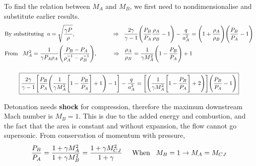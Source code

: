 \documentclass[a4paper,10pt]{article}
\begin{document}
\vspace*{-0.6cm}
To find the relation between $M_A$ and $M_B$, we first need to nondimensionalise and substitute earlier results.
\begin{gather*}
    \begin{split}
        &\text{By substituting}\hspace*{0.2cm}a = \sqrt{\frac{\gamma P}{\rho}},\hspace*{2.3cm}\Rightarrow\hspace*{0.2cm}\frac{2\gamma}{\gamma-1}\Bigg(\frac{P_B}{P_A}\frac{\rho_A}{\rho_B}-1\Bigg)-\frac{q}{a_A^2} = \Bigg(1+\frac{\rho_A}{\rho_B}\Bigg)\Bigg(\frac{P_B}{P_A}-1\Bigg)\\
        &\text{From}\hspace*{0.3cm}M_A^2 = \frac{1}{\gamma P_A\rho_A}\Bigg(\frac{P_B-P_A}{\rho_A^{-1}-\rho_B^{-1}}\Bigg),\hspace*{1cm}\Rightarrow\hspace*{0.2cm}\frac{\rho_A}{\rho_B}=\frac{1}{\gamma M_A^2}\Bigg(1-\frac{P_B}{P_A}\Bigg)+1
    \end{split}\\[0.5cm]
    \boxed{\frac{2\gamma}{\gamma-1}\Bigg[\frac{P_B}{P_A}\Bigg(\frac{1}{\gamma M_A^2}\Bigg[1-\frac{P_B}{P_A}\Bigg]+1\Bigg)-1\Bigg]-\frac{q}{a_A^2}=\Bigg[\Bigg(\frac{1}{\gamma M_A^2}\Bigg[1-\frac{P_B}{P_A}\Bigg]+2\Bigg)\Bigg]\Bigg(\frac{P_B}{P_A}-1\Bigg)}
\end{gather*}

Detonation needs \textbf{shock} for compression, therefore the maximum downstream Mach number is $M_B=1$. This is due to the added energy and combustion, and the fact that the area is constant and without expansion, the flow cannot go supersonic. From conservation of momentum with pressure,
\begin{gather*}
    \frac{P_B}{P_A} = \frac{1+\gamma M_A^2}{1+\gamma M_B^2} = \frac{1+\gamma M_{CJ}^2}{1+\gamma}\hspace*{0.5cm}\text{When}\hspace*{0.3cm}M_B=1\rightarrow M_A = M_{CJ} 
\end{gather*}
\end{document}
